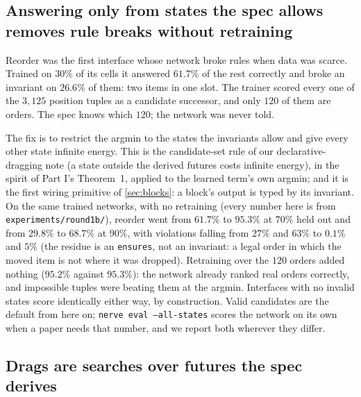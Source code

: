 \subsection{Answering only from states the spec allows removes rule breaks without retraining}
\label{sec:valid}

Reorder was the first interface whose network broke rules when data was scarce. Trained on $30\%$ of its
cells it answered $61.7\%$ of the rest correctly and broke an invariant on $26.6\%$ of them: two items in one
slot. The trainer scored every one of the $3{,}125$ position tuples as a candidate successor, and only $120$
of them are orders. The spec knows which $120$; the network was never told.

The fix is to restrict the argmin to the states the invariants allow and give every other state infinite
energy. This is the candidate-set rule of our declarative-dragging note (a state outside the derived futures
costs infinite energy), in the spirit of Part I's Theorem~1, applied to the learned term's own argmin; and it
is the first wiring primitive of \cref{sec:blocks}: a block's output is typed by its invariant. On the same
trained networks, with no retraining (every number here is from \texttt{experiments/round1b/}), reorder went from $61.7\%$
to $95.3\%$ at $70\%$ held out and from $29.8\%$ to $68.7\%$ at $90\%$, with violations falling from $27\%$ and
$63\%$ to $0.1\%$ and $5\%$ (the residue is an \texttt{ensures}, not an invariant: a legal order in which the
moved item is not where it was dropped). Retraining over the $120$ orders added nothing ($95.2\%$ against
$95.3\%$): the network already ranked real orders correctly, and impossible tuples were beating them at the
argmin. Interfaces with no invalid states score identically either way, by construction. Valid candidates are
the default from here on; \texttt{nerve eval --all-states} scores the network on its own when a paper needs
that number, and we report both wherever they differ.

\subsection{Drags are searches over futures the spec derives}
\label{sec:drags}


